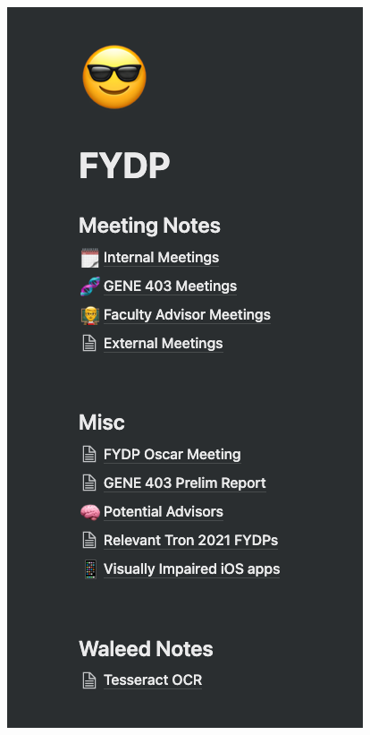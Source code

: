 \documentclass[a4paper,11pt]{article}
\begin{document}
\begin{center}
    \includegraphics[width={0.3\linewidth}]{img/notion/notion1.png}

\end{center}
\end{document}
